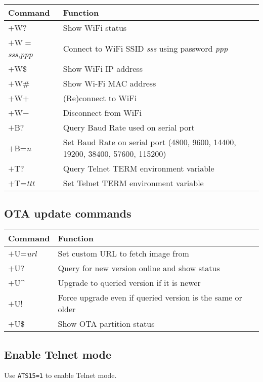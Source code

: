 \begin{tabular}{p{6em} | p{}}
\hline
\textbf{Command} & \textbf{Function} \\
\hline
$+$W?		& Show WiFi status \\
$+$W$=$\textit{sss},\textit{ppp}	& Connect to WiFi SSID \textit{sss} using password \textit{ppp} \\
$+$W\$		& Show WiFi IP address \\
$+$W\#		& Show Wi-Fi MAC address \\
$+$W$+$		& (Re)connect to WiFi \\
$+$W$-$		& Disconnect from WiFi \\
$+$B?		& Query Baud Rate used on serial port \\
$+$B=\textit{n}	& Set Baud Rate on serial port \newline
			(4800, 9600, 14400, 19200, 38400, 57600, 115200) \\
$+$T?		& Query Telnet TERM environment variable \\
$+$T=\textit{ttt}	& Set Telnet TERM environment variable \\
\hline
\end{tabular}

\subsection{OTA update commands}

\begin{tabular}{p{6em} | p{}}
\hline
\textbf{Command} 		& \textbf{Function} \\
\hline
$+$U=\textit{url}		& Set custom URL to fetch image from \\
$+$U?					& Query for new version online and show status \\
$+$U\textasciicircum 	& Upgrade to queried version if it is newer \\
$+$U!					& Force upgrade even if queried version is the same or older \\
$+$U\$					& Show OTA partition status \\
\hline
\end{tabular}

\subsection{Enable Telnet mode}

Use \texttt{ATS15=1} to enable Telnet mode.

\newpage
